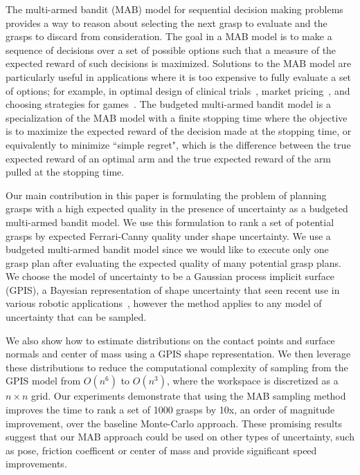 \documentclass[letterpaper, 10 pt, conference]{ieeeconf}  %
\begin{document}
The multi-armed bandit (MAB) model for sequential decision making problems \cite{barto1998reinforcement, lai1985asymptotically, robbins1952some} provides a way to reason about selecting the next grasp to evaluate and the grasps to discard from consideration.
The goal in a MAB model is to make a sequence of decisions over a set of possible options such that a measure of the expected reward of such decisions is maximized.
Solutions to the MAB model are particularly useful in applications where it is too expensive to fully evaluate a set of options; for example, in optimal design of clinical trials~\cite{simon1989optimal}, market pricing~\cite{rothschild1974two}, and choosing strategies for games~\cite{st2012online}.
The budgeted multi-armed bandit model \cite{madani2004budgeted} is a specialization of the MAB model with a finite stopping time where the objective is to maximize the expected reward of the decision made at the stopping time, or equivalently to minimize ``simple regret", which is the difference between the true expected reward of an optimal arm and the true expected reward of the arm pulled at the stopping time.

Our main contribution in this paper is formulating the problem of planning grasps with a high expected quality in the presence of uncertainty as a budgeted multi-armed bandit model.
We use this formulation to rank a set of potential grasps by expected Ferrari-Canny quality \cite{ferrari1992} under shape uncertainty.
We use a budgeted multi-armed bandit model since we would like to execute only one grasp plan after evaluating the expected quality of many potential grasp plans.
We choose the model of uncertainty to be a Gaussian process implicit surface (GPIS), a Bayesian representation of shape uncertainty that seen recent use in various robotic applications~\cite{dragiev2011, hollinger2013}, however the method applies to any model of uncertainty that can be sampled.

We also show how to estimate distributions on the contact points and surface normals and center of mass using a GPIS shape representation. We then leverage these distributions to reduce the computational complexity of sampling from the GPIS model from $O(n^6)$ to $O(n^3)$, where the workspace is discretized as a $n \times n$ grid. Our experiments demonstrate that using the MAB sampling method improves the time to rank a set of 1000 grasps by 10x, an order of magnitude improvement, over the baseline Monte-Carlo approach. These promising results suggest that our MAB approach could be used on other types of uncertainty, such as pose, friction coefficent or center of mass and provide significant speed improvements. 
\end{document}
